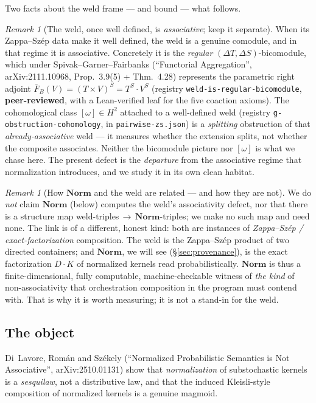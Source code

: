 \documentclass[11pt]{amsart}
\theoremstyle{plain}
\theoremstyle{definition}
\theoremstyle{remark}
\newtheorem{remark}[theorem]{Remark}
\newcommand{\Norm}{\mathbf{Norm}}
\newcommand{\Store}[1]{\Delta #1}
\begin{document}
Two facts about the weld frame --- and bound --- what follows.

\begin{remark}[The weld, once well defined, is \emph{associative}; keep it separate]
\label{rem:separate}
When its Zappa--Sz\'ep data make it well defined, the weld is a genuine comodule, and in that regime
it is associative. Concretely it is the \emph{regular} $(\Store{T},\Store{S})$-bicomodule, which
under Spivak--Garner--Fairbanks (``Functorial Aggregation'', arXiv:2111.10968, Prop.~3.9(5) +
Thm.~4.28) represents the parametric right adjoint $\bar F_B(V)=(T\times V)^{S}=T^{S}\cdot V^{S}$
(registry \texttt{weld-is-regular-bicomodule}, \textbf{peer-reviewed}, with a Lean-verified leaf for
the five coaction axioms). The cohomological class $[\omega]\in H^{2}$ attached to a well-defined
weld (registry \texttt{g-obstruction-cohomology}, in \texttt{pairwise-zs.json}) is a \emph{splitting}
obstruction of that \emph{already-associative} weld --- it measures whether the extension splits, not
whether the composite associates. Neither the bicomodule picture nor $[\omega]$ is what we chase
here. The present defect is the \emph{departure} from the associative regime that normalization
introduces, and we study it in its own clean habitat.
\end{remark}

\begin{remark}[How $\Norm$ and the weld are related --- and how they are not]
\label{rem:link}
We do \emph{not} claim $\Norm$ (below) computes the weld's associativity defect, nor that there is a
structure map weld-triples$\,\to\,\Norm$-triples; we make no such map and need none. The link is of a
different, honest kind: both are instances of \emph{Zappa--Sz\'ep / exact-factorization}
composition. The weld is the Zappa--Sz\'ep product of two directed containers; and $\Norm$, we will
see (\S\ref{sec:provenance}), is the exact factorization $D\cdot K$ of normalized kernels read
probabilistically. $\Norm$ is thus a finite-dimensional, fully computable, machine-checkable witness
of \emph{the kind} of non-associativity that orchestration composition in the program must contend
with. That is why it is worth measuring; it is not a stand-in for the weld.
\end{remark}

\subsection*{The object}
Di~Lavore, Rom\'an and Sz\'ekely (``Normalized Probabilistic Semantics is Not Associative'',
arXiv:2510.01131) show that \emph{normalization} of substochastic kernels is a \emph{sesquilaw}, not
a distributive law, and that the induced Kleisli-style composition of normalized kernels is a genuine
magmoid.
\end{document}
